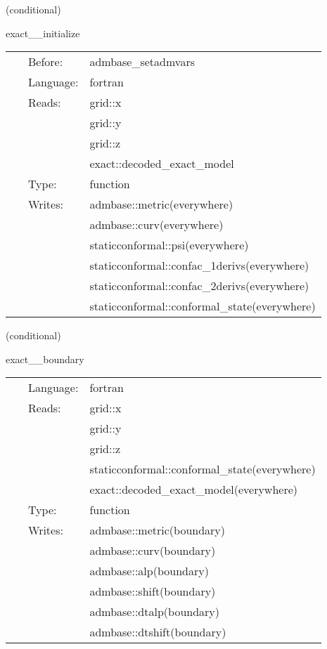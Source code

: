 \vspace{5mm}

   (conditional) 

\hspace{5mm} exact\_\_initialize 

\hspace{5mm}{\it set data from exact solution on an exact slice } 


\hspace{5mm}

 \begin{tabular*}{160mm}{cll} 
~ & Before:  & admbase\_setadmvars \\ 
~ & Language:  & fortran \\ 
~ & Reads:  & grid::x \\ 
~& ~ &grid::y\\ 
~& ~ &grid::z\\ 
~& ~ &exact::decoded\_exact\_model\\ 
~ & Type:  & function \\ 
~ & Writes:  & admbase::metric(everywhere) \\ 
~& ~ &admbase::curv(everywhere)\\ 
~& ~ &staticconformal::psi(everywhere)\\ 
~& ~ &staticconformal::confac\_1derivs(everywhere)\\ 
~& ~ &staticconformal::confac\_2derivs(everywhere)\\ 
~& ~ &staticconformal::conformal\_state(everywhere)\\ 
\end{tabular*} 


\vspace{5mm}

   (conditional) 

\hspace{5mm} exact\_\_boundary 

\hspace{5mm}{\it overwrite g and k on the boundary with exact solution data } 


\hspace{5mm}

 \begin{tabular*}{160mm}{cll} 
~ & Language:  & fortran \\ 
~ & Reads:  & grid::x \\ 
~& ~ &grid::y\\ 
~& ~ &grid::z\\ 
~& ~ &staticconformal::conformal\_state(everywhere)\\ 
~& ~ &exact::decoded\_exact\_model(everywhere)\\ 
~ & Type:  & function \\ 
~ & Writes:  & admbase::metric(boundary) \\ 
~& ~ &admbase::curv(boundary)\\ 
~& ~ &admbase::alp(boundary)\\ 
~& ~ &admbase::shift(boundary)\\ 
~& ~ &admbase::dtalp(boundary)\\ 
~& ~ &admbase::dtshift(boundary)\\ 
\end{tabular*} 


